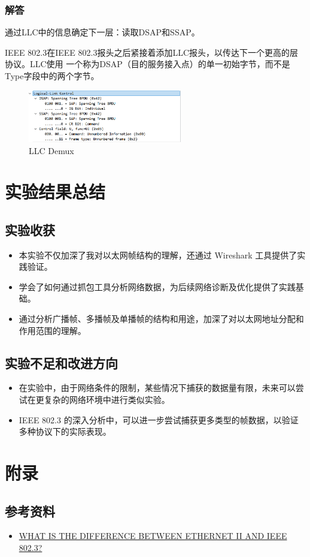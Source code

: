 \documentclass[14pt,a4paper,UTF8,twoside]{article}
\begin{document}
\subsubsection*{解答}

通过LLC中的信息确定下一层：读取DSAP和SSAP。

IEEE 802.3在IEEE 802.3报头之后紧接着添加LLC报头，以传达下一个更高的层协议。LLC使用
一个称为DSAP（目的服务接入点）的单一初始字节，而不是Type字段中的两个字节。

\begin{figure}[H]
  \centering
  \includegraphics[width=0.6\textwidth]{lab2/DSAP.png}
  \caption{LLC Demux}
\end{figure}

\section{实验结果总结}

\subsection*{实验收获}

\begin{itemize}
  \item 本实验不仅加深了我对以太网帧结构的理解，还通过 Wireshark 工具提供了实践验证。
  \item 学会了如何通过抓包工具分析网络数据，为后续网络诊断及优化提供了实践基础。
  \item 通过分析广播帧、多播帧及单播帧的结构和用途，加深了对以太网地址分配和作用范围的理解。
\end{itemize}
  
\subsection*{实验不足和改进方向}

\begin{itemize}
  \item 在实验中，由于网络条件的限制，某些情况下捕获的数据量有限，未来可以尝试在更复杂的网络环境中进行类似实验。
  \item IEEE 802.3 的深入分析中，可以进一步尝试捕获更多类型的帧数据，以验证多种协议下的实际表现。
\end{itemize}

\section{附录}

\subsection*{参考资料}

\begin{itemize}
  \item \href{https://www.globalknowledge.com/us-en/resources/resource-library/articles/what-is-the-difference-between-ethernet-ii-and-ieee-8023/}{WHAT IS THE DIFFERENCE BETWEEN ETHERNET II AND IEEE 802.3?}
\end{itemize}
\end{document}
